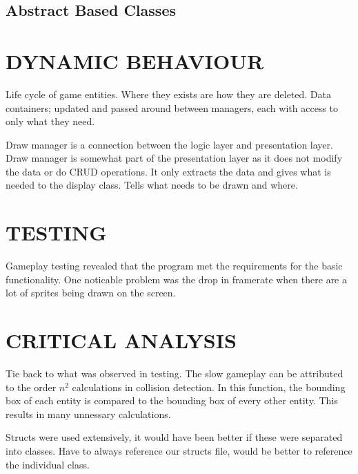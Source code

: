 \documentclass[10pt,twocolumn]{witseiepaper}
\begin{document}
\subsection{Abstract Based Classes}




%
\section{DYNAMIC BEHAVIOUR}
Life cycle of game entities. Where they exists are how they are deleted. Data containers; updated and passed around between managers, each with access to only what they need. 

Draw manager is a connection between the logic layer and presentation layer. Draw manager is somewhat part of the presentation layer as it does not modify the data or do CRUD operations. It only extracts the data and gives what is needed to the display class. Tells what needs to be drawn and where.



%
\section{TESTING}
Gameplay testing revealed that the program met the requirements for the basic functionality. One noticable problem was the drop in framerate when there are a lot of sprites being drawn on the screen.

%
\section{CRITICAL ANALYSIS}
Tie back to what was observed in testing. The slow gameplay can be attributed to the order $ n^{2} $ calculations in collision detection. In this function, the bounding box of each entity is compared to the bounding box of every other entity. This results in many unnessary calculations.

Structs were used extensively, it would have been better if these were separated into classes. Have to always reference our structs file, would be better to reference the individual class. 
\end{document}
